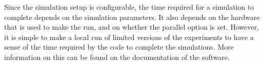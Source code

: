 \documentclass[crop]{CSLB}
\newcommand{\hs}{\textsc{hearsay}}
\begin{document}
Since the simulation setup is configurable, the time required for a simulation
to complete depends on the simulation parameters.
%
It also depends on the hardware that is used to make the run, and on whether
the parallel option is set.
%
However, it is simple to make a local run of limited versions of the
experiments to have a sense of the time required by the code to complete the
simulations.
%
More information on this can be found on the documentation of the software.
\end{document}
